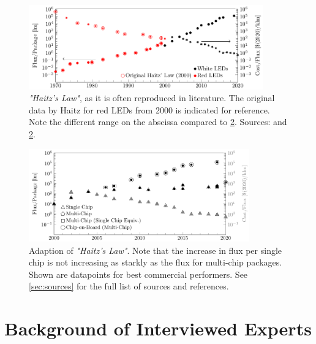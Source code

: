 \documentclass[parskip=full]{article}
\begin{document}
\begin{figure}[h!]
\vspace{-10mm}
    \includegraphics[width=0.9\textwidth]{./figures/haitz_law_old_both.pdf}
    \caption{\textit{"Haitz's Law"}, as it is often reproduced in literature. The original data by Haitz for red LEDs from 2000 is indicated for reference. Note the different range on the abscissa compared to \cref{fig:haitz_new}. Sources: \cite{haitz1999case}\cite{haitz2011solid} and  \cref{fig:haitz_new}.}
    \label{fig:haitz-org}
\end{figure}

\begin{figure}[h!]
    \centering
    \includegraphics[width=0.85\textwidth]{./figures/haitz_law_white.pdf}
    \caption{Adaption of \textit{"Haitz's Law"}. Note that the increase in flux per single chip is not increasing as starkly as the flux for multi-chip packages. Shown are datapoints for best commercial performers. See \cref{sec:sources} for the full list of sources and references.}
    \label{fig:haitz_new}
\end{figure}

\section{Background of Interviewed Experts}
\end{document}
